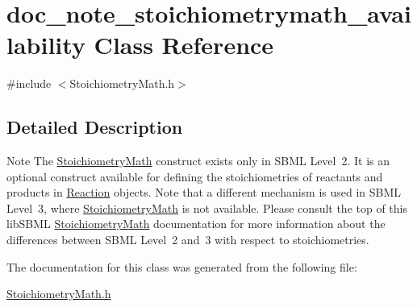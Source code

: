 \hypertarget{classdoc__note__stoichiometrymath__availability}{}\section{doc\+\_\+note\+\_\+stoichiometrymath\+\_\+availability Class Reference}
\label{classdoc__note__stoichiometrymath__availability}


{\ttfamily \#include $<$Stoichiometry\+Math.\+h$>$}



\subsection{Detailed Description}
\begin{DoxyNote}{Note}
The \hyperlink{class_stoichiometry_math}{Stoichiometry\+Math} construct exists only in S\+B\+ML Level~2. It is an optional construct available for defining the stoichiometries of reactants and products in \hyperlink{class_reaction}{Reaction} objects. Note that a different mechanism is used in S\+B\+ML Level~3, where \hyperlink{class_stoichiometry_math}{Stoichiometry\+Math} is not available. Please consult the top of this lib\+S\+B\+ML \hyperlink{class_stoichiometry_math}{Stoichiometry\+Math} documentation for more information about the differences between S\+B\+ML Level~2 and~3 with respect to stoichiometries. 
\end{DoxyNote}


The documentation for this class was generated from the following file\+:\begin{DoxyCompactItemize}
\item 
\hyperlink{_stoichiometry_math_8h}{Stoichiometry\+Math.\+h}\end{DoxyCompactItemize}
